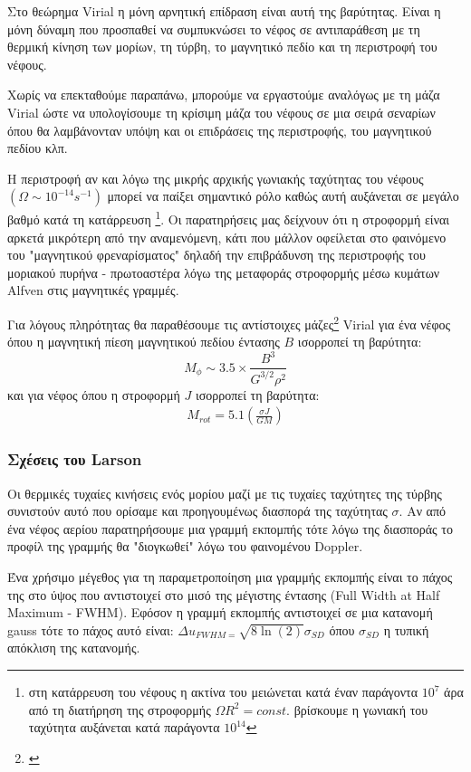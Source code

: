 \documentclass[a4paper,12pt]{memoir}
\begin{document}
Στο θεώρημα Virial η μόνη αρνητική επίδραση είναι αυτή της βαρύτητας. Είναι η μόνη δύναμη που προσπαθεί να συμπυκνώσει το νέφος σε αντιπαράθεση με τη θερμική κίνηση των μορίων, τη τύρβη, το μαγνητικό πεδίο και τη περιστροφή του νέφους.

Χωρίς να επεκταθούμε παραπάνω, μπορούμε να εργαστούμε αναλόγως με τη μάζα Virial ώστε να υπολογίσουμε τη κρίσιμη μάζα του νέφους σε μια σειρά σεναρίων όπου θα λαμβάνονταν υπόψη και οι επιδράσεις της περιστροφής, του μαγνητικού πεδίου κλπ.

Η περιστροφή αν και λόγω της μικρής αρχικής γωνιακής ταχύτητας του νέφους $(\Omega \sim 10^{-14} s^{-1})$ μπορεί να παίξει σημαντικό ρόλο καθώς αυτή αυξάνεται σε μεγάλο βαθμό κατά τη κατάρρευση \footnote{στη κατάρρευση του νέφους η ακτίνα του μειώνεται κατά έναν παράγοντα $10^7$ άρα από τη διατήρηση της στροφορμής $\Omega R^2 = const.$ βρίσκουμε η γωνιακή του ταχύτητα αυξάνεται κατά παράγοντα $10^{14}$}. Οι παρατηρήσεις μας δείχνουν ότι η στροφορμή είναι αρκετά μικρότερη από την αναμενόμενη, κάτι που μάλλον οφείλεται στο φαινόμενο του "μαγνητικού φρεναρίσματος" δηλαδή την επιβράδυνση της περιστροφής του μοριακού πυρήνα - πρωτοαστέρα λόγω της μεταφοράς στροφορμής μέσω κυμάτων Alfven στις μαγνητικές γραμμές.

Για λόγους πληρότητας θα παραθέσουμε τις αντίστοιχες μάζες\footnote{\cite{schulz_2012}} Virial για ένα νέφος όπου η μαγνητική πίεση μαγνητικού πεδίου έντασης $B$ ισορροπεί τη βαρύτητα:
\begin{equation}
M_{\phi} \sim 3.5 \times \frac{B^3}{G^{3/2} \rho^2} 
\end{equation}
και για νέφος όπου η στροφορμή $J$ ισορροπεί τη βαρύτητα:
\begin{align}
M_{rot} = 5.1 \left( \frac{\sigma J}{G M} \right) 
\end{align}

\subsubsection{Σχέσεις του Larson}
\label{par:LarsonLaws}
Οι θερμικές τυχαίες κινήσεις ενός μορίου μαζί με τις τυχαίες ταχύτητες της τύρβης συνιστούν αυτό που ορίσαμε και προηγουμένως διασπορά της ταχύτητας $\sigma$. Αν από ένα νέφος αερίου παρατηρήσουμε μια γραμμή εκπομπής τότε λόγω της διασποράς το προφίλ της γραμμής θα "διογκωθεί" λόγω του φαινομένου Doppler. 

Ένα χρήσιμο μέγεθος για τη παραμετροποίηση μια γραμμής εκπομπής είναι το πάχος της στο ύψος που αντιστοιχεί στο μισό της μέγιστης έντασης (Full Width at Half Maximum - FWHM). Εφόσον η γραμμή εκπομπής αντιστοιχεί σε μια κατανομή gauss τότε το πάχος αυτό είναι: $\Delta u _{FWHM = }\sqrt{8 \ln(2)} \sigma _{SD}$ όπου $\sigma _{SD}$ η τυπική απόκλιση της κατανομής. 
\end{document}
